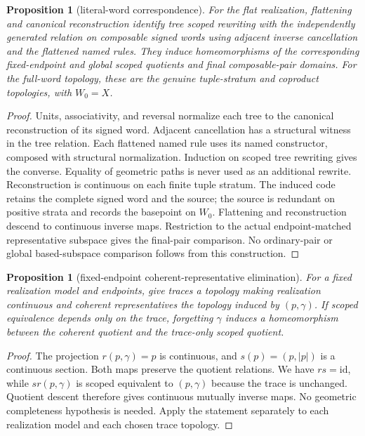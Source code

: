 \documentclass[10pt,reqno]{amsart}
\theoremstyle{definition}
\theoremstyle{plain}
\newtheorem{proposition}[definition]{Proposition}
\theoremstyle{remark}
\begin{document}
\begin{proposition}[literal-word correspondence]
\label{prop:literal-word-correspondence}
For the flat realization, flattening and canonical reconstruction identify
tree scoped rewriting with the independently generated relation on
composable signed words using adjacent inverse cancellation and the
flattened named rules. They induce homeomorphisms of the corresponding
fixed-endpoint and global scoped quotients and final composable-pair
domains. For the full-word topology, these are the genuine tuple-stratum
and coproduct topologies, with $W_0=X$.
\end{proposition}
\begin{proof}
Units, associativity, and reversal normalize each tree to the canonical
reconstruction of its signed word. Adjacent cancellation has a structural witness in the tree relation.
Each flattened named rule uses its named constructor, composed with
structural normalization. Induction on scoped tree rewriting gives the
converse. Equality of geometric paths is never
used as an additional rewrite. Reconstruction is continuous on each
finite tuple stratum. The induced code retains the complete signed word
and the source; the source is redundant on positive strata and records the
basepoint on $W_0$. Flattening and reconstruction descend to continuous
inverse maps. Restriction to the actual endpoint-matched representative
subspace gives the final-pair comparison. No ordinary-pair or global
based-subspace comparison follows from this construction.
\end{proof}

\begin{proposition}[fixed-endpoint coherent-representative elimination]
\label{prop:coherent-elimination}
For a fixed realization model and endpoints, give traces a topology making
realization continuous and coherent representatives the topology induced by
$(p,\gamma)$. If scoped equivalence depends only on the trace, forgetting
$\gamma$ induces a homeomorphism between the coherent quotient and the
trace-only scoped quotient.
\end{proposition}
\begin{proof}
The projection $r(p,\gamma)=p$ is continuous, and
$s(p)=(p,|p|)$ is a continuous section. Both maps preserve the quotient
relations. We have $r s=\mathrm{id}$, while $s r(p,\gamma)$ is scoped
equivalent to $(p,\gamma)$ because the trace is unchanged. Quotient descent
therefore gives continuous mutually inverse maps. No geometric completeness
hypothesis is needed. Apply the statement separately to each realization
model and each chosen trace topology.
\end{proof}
\end{document}
